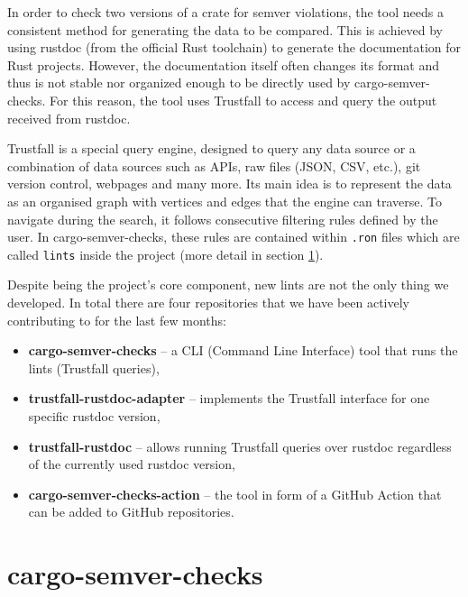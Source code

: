 \documentclass[licencjacka,en]{pracamgr}
\begin{document}
In order to check two versions of a crate for semver violations, the tool needs a consistent method
for generating the data to be compared. This is achieved by using rustdoc (from the official
Rust toolchain) to generate the documentation for Rust projects. However, the documentation itself
often changes its format and thus is not stable nor organized enough to be directly used by
cargo-semver-checks. For this reason, the tool uses Trustfall to access and query the output received from
rustdoc.

Trustfall is a special query engine, designed to query any data source or a combination of data
sources such as APIs, raw files (JSON, CSV, etc.), git version control, webpages and many more.
Its main idea is to represent the data as an organised graph with vertices and edges that the
engine can traverse. To navigate during the search, it follows consecutive filtering rules defined
by the user. In cargo-semver-checks, these rules are contained within \texttt{.ron} files which
are called \texttt{lints} inside the project (more detail in section
\ref{r:section_cargo_semver_checks}).

Despite being the project's core component, new lints are not the only thing we developed. In total
there are four repositories that we have been actively contributing to for the last few months:
\begin{itemize}
	\item \textbf{cargo-semver-checks} -- a CLI (Command Line Interface) tool that runs the lints
		(Trustfall queries),
	\item \textbf{trustfall-rustdoc-adapter} -- implements the Trustfall interface for one specific
		rustdoc version,
	\item \textbf{trustfall-rustdoc} -- allows running Trustfall queries over rustdoc regardless of
		the currently used rustdoc version,
	\item \textbf{cargo-semver-checks-action} -- the tool in form of a GitHub Action that can
	    be added to GitHub repositories.
\end{itemize}

\section{cargo-semver-checks}\label{r:section_cargo_semver_checks}
\end{document}
